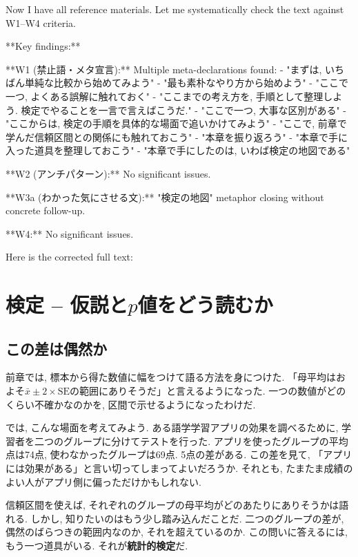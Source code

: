 ﻿Now I have all reference materials. Let me systematically check the text against W1–W4 criteria.

**Key findings:**

**W1 (禁止語・メタ宣言):** Multiple meta-declarations found:
- "まずは, いちばん単純な比較から始めてみよう"
- "最も素朴なやり方から始めよう"
- "ここで一つ, よくある誤解に触れておく"
- "ここまでの考え方を, 手順として整理しよう. 検定でやることを一言で言えばこうだ."
- "ここで一つ, 大事な区別がある"
- "ここからは, 検定の手順を具体的な場面で追いかけてみよう"
- "ここで, 前章で学んだ信頼区間との関係にも触れておこう"
- "本章を振り返ろう"
- "本章で手に入った道具を整理しておこう"
- "本章で手にしたのは, いわば検定の地図である"

**W2 (アンチパターン):** No significant issues.

**W3a (わかった気にさせる文):** "検定の地図" metaphor closing without concrete follow-up.

**W4:** No significant issues.

Here is the corrected full text:

\section{検定 -- 仮説と$p$値をどう読むか}

  \subsection{この差は偶然か}

    前章では, 標本から得た数値に幅をつけて語る方法を身につけた.
    「母平均はおよそ$\bar{x} \pm 2 \times \mathrm{SE}$の範囲にありそうだ」と言えるようになった.
    一つの数値がどのくらい不確かなのかを, 区間で示せるようになったわけだ.

    では, こんな場面を考えてみよう.
    ある語学学習アプリの効果を調べるために, 学習者を二つのグループに分けてテストを行った.
    アプリを使ったグループの平均点は74点, 使わなかったグループは69点.
    5点の差がある.
    この差を見て, 「アプリには効果がある」と言い切ってしまってよいだろうか.
    それとも, たまたま成績のよい人がアプリ側に偏っただけかもしれない.

    信頼区間を使えば, それぞれのグループの母平均がどのあたりにありそうかは語れる.
    しかし, 知りたいのはもう少し踏み込んだことだ.
    二つのグループの差が, 偶然のばらつきの範囲内なのか, それを超えているのか.
    この問いに答えるには, もう一つ道具がいる.
    それが\textbf{統計的検定}だ.

